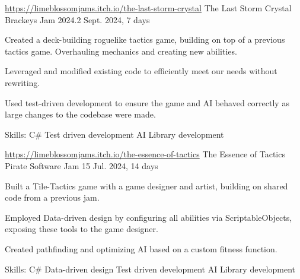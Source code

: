 

\begin{cventries}

 \cventry
 {\href{https://limeblossomjams.itch.io/the-last-storm-crystal}{https://limeblossomjams.itch.io/the-last-storm-crystal}} %
 {The Last Storm Crystal} %
 {Brackeys Jam 2024.2} %
 {Sept. 2024, 7 days} %
 {
     \begin{cvitems} %
      \item {Created a deck-building roguelike tactics game, building on top of a previous tactics game. Overhauling mechanics and creating new abilities.}
      \item {Leveraged and modified existing code to efficiently meet our needs without rewriting.}
      \item {Used test-driven development to ensure the game and AI behaved correctly as large changes to the codebase were made.}
      \item {Skills: C\# \textbullet{} Test driven development \textbullet{} AI \textbullet{} Library development }
     \end{cvitems}
 }
 
  \cventry
 {\href{https://limeblossomjams.itch.io/the-essence-of-tactics}{https://limeblossomjams.itch.io/the-essence-of-tactics}} %
 {The Essence of Tactics} %
 {Pirate Software Jam 15} %
 {Jul. 2024, 14 days} %
 {
      \begin{cvitems} %
        \item {Built a Tile-Tactics game with a game designer and artist, building on shared code from a previous jam.}
        \item {Employed Data-driven design by configuring all abilities via ScriptableObjects, exposing these tools to the game designer.}
        \item {Created pathfinding and optimizing AI based on a custom fitness function.}
        \item {Skills: C\# \textbullet{} Data-driven design \textbullet{} Test driven development \textbullet{} AI \textbullet{} Library development }
      \end{cvitems}
 }


\end{cventries}
